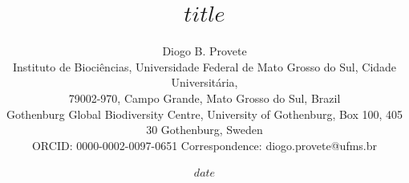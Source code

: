 \title{$title$}
\author{Diogo B. Provete\\[6pt]
\footnotesize Instituto de Biociências, Universidade Federal de Mato Grosso do Sul, Cidade Universitária,\\
\footnotesize 79002-970, Campo Grande, Mato Grosso do Sul, Brazil\\
\footnotesize Gothenburg Global Biodiversity Centre, University of Gothenburg, Box 100, 405 30 Gothenburg, Sweden\\[3pt]
\footnotesize ORCID: 0000-0002-0097-0651 \quad Correspondence: diogo.provete@ufms.br}
\date{$date$}
